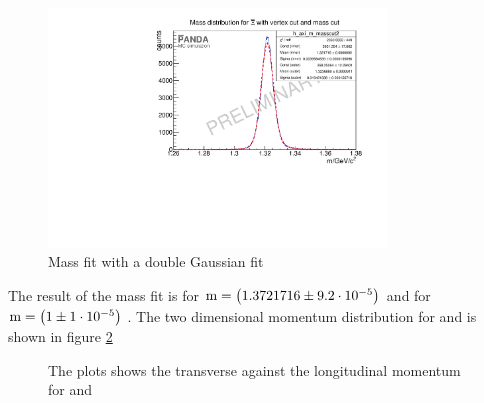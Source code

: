 		\begin{figure}
			\centering
				\includegraphics[width=0.8\textwidth]{./plots/Xi/XiPlus_m_masscut.pdf}
			\caption{\propose Mass fit with a double Gaussian fit}
			\label{fig:XiPlus_massfit}
		\end{figure}
		The result of the mass fit is for \anticascade $\textnormal{m} = \left( 1.3721716 \pm 9.2\cdot 10^{-5}\right)$ \massunit 
		and for \cascade $\textnormal{m} = \left( 1\pm 1\cdot 10^{-5}\right)$ \massunit.
		The two dimensional momentum distribution for \anticascade and \cascade is shown in figure \ref{fig:XiPlus_pt_vs_pz} 
		
		\begin{figure}
			\caption{\propose The plots shows the transverse against the longitudinal momentum for \anticascade and \cascade}
			\label{fig:XiPlus_pt_vs_pz}
		
		\end{figure}
		
